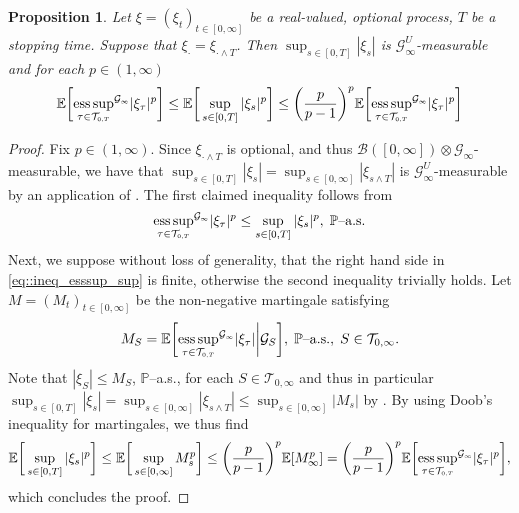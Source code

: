 \documentclass[10pt]{article} %
\newtheorem{proposition}[theorem]{Proposition}
\newcommand\cB{\mathcal B}
\newcommand\cG{\mathcal G}
\newcommand\cT{\mathcal T}
\newcommand{\smalltext}[1]{\text{\fontsize{4}{4}\selectfont$#1$}}
\def \E{\mathbb{E}}
\def \P{\mathbb{P}}
\newcommand{\1}{\mathbf{1}}
\begin{document}
\begin{proposition}\label{prop::equiv_integ_xi}
	Let $\xi = (\xi_t)_{t \in [0,\infty]}$ be a real-valued, optional process, $T$ be a stopping time. Suppose that $\xi_\cdot = \xi_{\cdot \land T}$. Then $\sup_{s \in [0,T]}|\xi_s|$ is $\cG^U_\infty$-measurable and for each $p \in (1,\infty)$
	\begin{equation}\label{eq::ineq_esssup_sup}
		\E\bigg[ \underset{\tau \in \cT_{\smalltext{0}\smalltext{,}\smalltext{T}}}{\rm ess\,sup}^{\cG_\smalltext{\infty}}|\xi_\tau|^p \bigg] \leq \E\bigg[\sup_{s \in [0,T]} |\xi_s|^p\bigg] \leq \bigg(\frac{p}{p-1}\bigg)^p \E\bigg[ \underset{\tau \in \cT_{\smalltext{0}\smalltext{,}\smalltext{T}}}{\rm ess\,sup}^{\cG_\smalltext{\infty}}|\xi_\tau|^p \bigg]
	\end{equation}
\end{proposition}

\begin{proof} 
	Fix $p \in (1,\infty)$. Since $\xi_{\cdot \land T}$ is optional, and thus $\cB([0,\infty]) \otimes \cG_\infty$-measurable, we have that $\sup_{s \in [0,T]} |\xi_s| = \sup_{s \in [0,\infty]} |\xi_{s \land T}|$ is $\cG^U_\infty$-measurable by an application of \cite[Proposition 2.21]{karoui2013capacities}. The first claimed inequality follows from
	\begin{equation*}
		\underset{\tau \in \cT_{\smalltext{0}\smalltext{,}\smalltext{T}}}{\rm ess\,sup}^{\cG_\smalltext{\infty}} |\xi_\tau|^p \leq \sup_{s \in [0,T]} |\xi_s|^p, \; \text{$\P$--a.s.}
	\end{equation*}
	Next, we suppose without loss of generality, that the right hand side in \eqref{eq::ineq_esssup_sup} is finite, otherwise the second inequality trivially holds. Let $M = (M_t)_{t \in [0,\infty]}$ be the non-negative martingale satisfying
	\begin{equation*}
		M_S = \E\bigg[ \underset{\tau \in \cT_{\smalltext{0}\smalltext{,}\smalltext{T}}}{\rm ess\,sup}^{\cG_\smalltext{\infty}} |\xi_\tau| \bigg| \cG_S \bigg], \; \text{$\P$--a.s.}, \; S \in \cT_{0,\infty}.
	\end{equation*}
	Note that $|\xi_S| \leq M_S$, $\P$--a.s., for each $S \in \cT_{0,\infty}$ and thus in particular $\sup_{s \in [0,T]} |\xi_s| = \sup_{s \in [0,\infty]} |\xi_{s \land T}| \leq \sup_{s \in [0,\infty]} |M_s|$
	by . By using Doob's inequality for martingales, we thus find
	\begin{equation*}
		\E\bigg[\sup_{s \in [0,T]} |\xi_s|^p\bigg] \leq \E\bigg[\sup_{s \in [0,\infty]} M_s^p\bigg] \leq \bigg(\frac{p}{p-1}\bigg)^p\E[ M_\infty^p ] = \bigg(\frac{p}{p-1}\bigg)^p \E\bigg[\underset{\tau \in \cT_{\smalltext{0}\smalltext{,}\smalltext{T}}}{\rm ess\,sup}^{\cG_\smalltext{\infty}} |\xi_\tau|^p \bigg],
	\end{equation*}
	which concludes the proof.
\end{proof}



{\small
}
\end{document}
